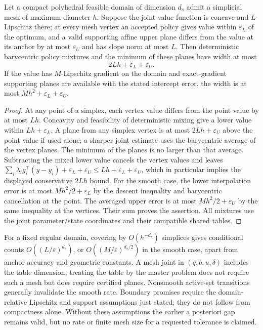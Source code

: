 \begin{proposition}\label{prop:r28-accuracy}
Let a compact polyhedral feasible domain of dimension $d_s$ admit a simplicial mesh of maximum diameter $h$. Suppose the joint value function is concave and $L$-Lipschitz there; at every mesh vertex an accepted policy gives value within $\varepsilon_L$ of the optimum, and a valid supporting affine upper plane differs from the value at its anchor by at most $\varepsilon_U$ and has slope norm at most $L$. Then deterministic barycentric policy mixtures and the minimum of these planes have width at most
\[
 2Lh+\varepsilon_L+\varepsilon_U.
\]
If the value has $M$-Lipschitz gradient on the domain and exact-gradient supporting planes are available with the stated intercept error, the width is at most $Mh^2+\varepsilon_L+\varepsilon_U$.
\end{proposition}
\begin{proof}
At any point of a simplex, each vertex value differs from the point value by at most $Lh$. Concavity and feasibility of deterministic mixing give a lower value within $Lh+\varepsilon_L$. A plane from any simplex vertex is at most $2Lh+\varepsilon_U$ above the point value if used alone; a sharper joint estimate uses the barycentric average of the vertex planes. The minimum of the planes is no larger than that average. Subtracting the mixed lower value cancels the vertex values and leaves $\sum_i\lambda_i g_i^\top(y-y_i)+\varepsilon_L+\varepsilon_U\leq Lh+\varepsilon_L+\varepsilon_U$, which in particular implies the displayed conservative $2Lh$ bound. For the smooth case, the lower interpolation error is at most $Mh^2/2+\varepsilon_L$ by the descent inequality and barycentric cancellation at the point. The averaged upper error is at most $Mh^2/2+\varepsilon_U$ by the same inequality at the vertices. Their sum proves the assertion. All mixtures use the joint parameter/state coordinates and their compatible shared tables.
\end{proof}

For a fixed regular domain, covering by $O(h^{-d_s})$ simplices gives conditional counts $O((L/\varepsilon)^{d_s})$, or $O((M/\varepsilon)^{d_s/2})$ in the smooth case, apart from anchor accuracy and geometric constants. A mesh joint in $(q,b,u,\delta)$ includes the table dimension; treating the table by the master problem does not require such a mesh but does require certified planes. Nonsmooth active-set transitions generally invalidate the smooth rate. Boundary promises require the domain-relative Lipschitz and support assumptions just stated; they do not follow from compactness alone. Without these assumptions the earlier a posteriori gap remains valid, but no rate or finite mesh size for a requested tolerance is claimed.

